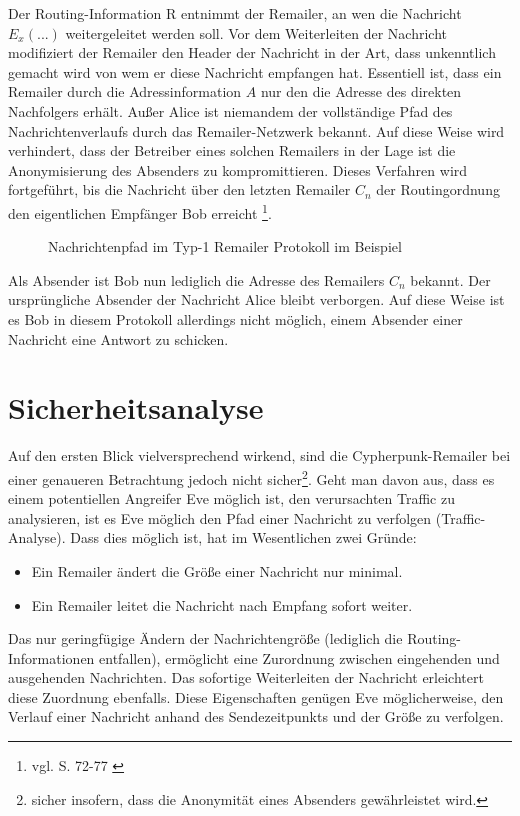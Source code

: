 Der Routing-Information R entnimmt der Remailer, an wen die Nachricht \(E_x(...)\) weitergeleitet werden soll. Vor dem Weiterleiten der Nachricht modifiziert der Remailer den Header der Nachricht in der Art, dass unkenntlich gemacht wird von wem er diese Nachricht empfangen hat. Essentiell ist, dass ein Remailer durch die Adressinformation \(A\) nur den die Adresse des direkten Nachfolgers erhält. Außer Alice ist niemandem der vollständige Pfad des Nachrichtenverlaufs durch das Remailer-Netzwerk bekannt. Auf diese Weise wird verhindert, dass der Betreiber eines solchen Remailers in der Lage ist die Anonymisierung des Absenders zu kompromittieren. Dieses Verfahren wird fortgeführt, bis die Nachricht über den letzten Remailer \(C_n\) der Routingordnung den eigentlichen Empfänger Bob erreicht \footnote{vgl. S. 72-77 \cite{kubieziel2007anonym}}.

\begin{figure}
	\begin{center}
		\def\svgwidth{0.8 \linewidth}
		
		\caption{Nachrichtenpfad im Typ-1 Remailer Protokoll im Beispiel}
	\end{center}
	
\end{figure}

Als Absender ist Bob nun lediglich die Adresse des Remailers \(C_n\) bekannt. Der ursprüngliche Absender der Nachricht Alice bleibt verborgen. Auf diese Weise ist es Bob in diesem Protokoll allerdings nicht möglich, einem Absender einer Nachricht eine Antwort zu schicken.

\section{Sicherheitsanalyse}
Auf den ersten Blick vielversprechend wirkend, sind die Cypherpunk-Remailer bei einer genaueren Betrachtung jedoch nicht sicher\footnote{sicher insofern, dass die Anonymität eines Absenders gewährleistet wird.}. Geht man davon aus, dass es einem potentiellen Angreifer Eve möglich ist, den verursachten Traffic zu analysieren, ist es Eve möglich den Pfad einer Nachricht zu verfolgen (Traffic-Analyse). Dass dies möglich ist, hat im Wesentlichen zwei Gründe: 
\begin{itemize}
\item Ein Remailer ändert die Größe einer Nachricht nur minimal.
\item Ein Remailer leitet die Nachricht nach Empfang sofort weiter.
\end{itemize} 
Das nur geringfügige Ändern der Nachrichtengröße (lediglich die Routing-Informationen entfallen), ermöglicht eine Zurordnung zwischen eingehenden und ausgehenden Nachrichten. Das sofortige Weiterleiten der Nachricht erleichtert diese Zuordnung ebenfalls. Diese Eigenschaften genügen Eve möglicherweise, den Verlauf einer Nachricht anhand des Sendezeitpunkts und der Größe zu verfolgen.
